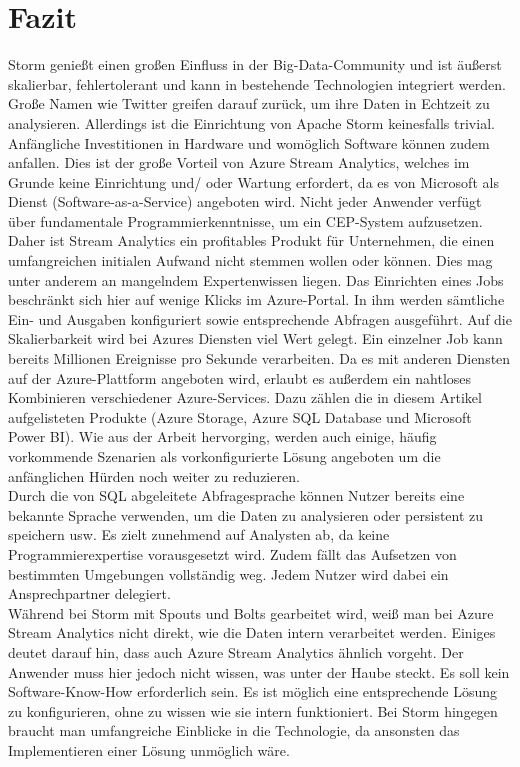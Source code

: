 \section{Fazit}
Storm genießt einen großen Einfluss in der Big-Data-Community und ist äußerst skalierbar, fehlertolerant und kann in bestehende Technologien integriert werden. Große Namen wie Twitter greifen darauf zurück, um ihre Daten in Echtzeit zu analysieren. Allerdings ist die Einrichtung von Apache Storm keinesfalls trivial. Anfängliche Investitionen in Hardware und womöglich Software können zudem anfallen. Dies ist der große Vorteil von Azure Stream Analytics, welches im Grunde keine Einrichtung und/ oder Wartung erfordert, da es von Microsoft als Dienst (Software-as-a-Service) angeboten wird. Nicht jeder Anwender verfügt über fundamentale Programmierkenntnisse, um ein CEP-System aufzusetzen. Daher ist Stream Analytics ein profitables Produkt für Unternehmen, die einen umfangreichen initialen Aufwand nicht stemmen wollen oder können. Dies mag unter anderem an mangelndem Expertenwissen liegen. Das Einrichten eines Jobs beschränkt sich hier auf wenige Klicks im Azure-Portal. In ihm werden sämtliche Ein- und Ausgaben konfiguriert sowie entsprechende Abfragen ausgeführt. Auf die Skalierbarkeit wird bei Azures Diensten viel Wert gelegt. Ein einzelner Job kann bereits Millionen Ereignisse pro Sekunde verarbeiten. Da es mit anderen Diensten auf der Azure-Plattform angeboten wird, erlaubt es außerdem ein nahtloses Kombinieren verschiedener Azure-Services. Dazu zählen die in diesem Artikel aufgelisteten Produkte (Azure Storage, Azure SQL Database und Microsoft Power BI). Wie aus der Arbeit hervorging, werden auch einige, häufig vorkommende Szenarien als vorkonfigurierte Lösung angeboten um die anfänglichen Hürden noch weiter zu reduzieren.\\
Durch die von SQL abgeleitete Abfragesprache können Nutzer bereits eine bekannte Sprache verwenden, um die Daten zu analysieren oder persistent zu speichern usw. Es zielt zunehmend auf Analysten ab, da keine Programmierexpertise vorausgesetzt wird. Zudem fällt das Aufsetzen von bestimmten Umgebungen vollständig weg. Jedem Nutzer wird dabei ein Ansprechpartner delegiert.\\ 
Während bei Storm mit Spouts und Bolts gearbeitet wird, weiß man bei Azure Stream Analytics nicht direkt, wie die Daten intern verarbeitet werden. Einiges deutet darauf hin, dass auch Azure Stream Analytics ähnlich vorgeht. Der Anwender muss hier jedoch nicht wissen, was unter der Haube steckt. Es soll kein Software-Know-How erforderlich sein. Es ist möglich eine entsprechende Lösung zu konfigurieren, ohne zu wissen wie sie intern funktioniert. Bei Storm hingegen braucht man umfangreiche Einblicke in die Technologie, da ansonsten das Implementieren einer Lösung unmöglich wäre.\\ 

